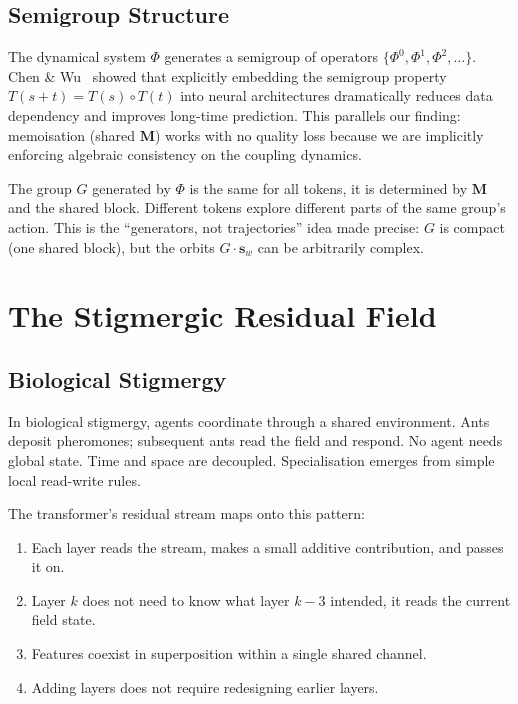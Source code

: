 \documentclass[11pt, a4paper]{article}
\newcommand{\M}{\mathbf{M}}
\newcommand{\s}{\mathbf{s}}
\theoremstyle{remark}
\begin{document}
\subsection{Semigroup Structure}

The dynamical system $\Phi$ generates a semigroup of operators $\{\Phi^0, \Phi^1, \Phi^2, \ldots\}$.
Chen \& Wu~\cite{chen2023deeposg} showed that explicitly embedding the semigroup property $T(s+t) = T(s) \circ T(t)$ into neural architectures dramatically reduces data dependency and improves long-time prediction.
This parallels our finding: memoisation (shared $\M$) works with no quality loss because we are implicitly enforcing algebraic consistency on the coupling dynamics.

The group $G$ generated by $\Phi$ is the same for all tokens, it is determined by $\M$ and the shared block.
Different tokens explore different parts of the same group's action.
This is the ``generators, not trajectories'' idea made precise: $G$ is compact (one shared block), but the orbits $G \cdot \s_w$ can be arbitrarily complex.


\section{The Stigmergic Residual Field}
\label{sec:stigmergy}

\subsection{Biological Stigmergy}

In biological stigmergy, agents coordinate through a shared environment.
Ants deposit pheromones; subsequent ants read the field and respond.
No agent needs global state.
Time and space are decoupled.
Specialisation emerges from simple local read-write rules.

The transformer's residual stream maps onto this pattern:
\begin{enumerate}[nosep]
    \item Each layer reads the stream, makes a small additive contribution, and passes it on.
    \item Layer $k$ does not need to know what layer $k{-}3$ intended, it reads the current field state.
    \item Features coexist in superposition within a single shared channel.
    \item Adding layers does not require redesigning earlier layers.
\end{enumerate}
\end{document}
